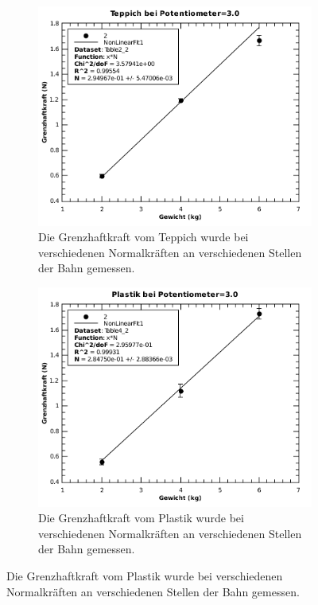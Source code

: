 \begin{figure}[H]
    \centering
    \begin{subfigure}{.7\textwidth}
        \includegraphics[width=\linewidth]{images/teppich_haft_poti=3}
        \caption{Die Grenzhaftkraft vom Teppich wurde bei verschiedenen Normalkr\"aften an verschiedenen Stellen der Bahn gemessen.}
        \label{fig:teppich_haft_poti=3}
    \end{subfigure}
    \begin{subfigure}{.7\textwidth}
        \includegraphics[width=\linewidth]{images/plastik_haft_poti=3}
        \caption{Die Grenzhaftkraft vom Plastik wurde bei verschiedenen Normalkr\"aften an verschiedenen Stellen der Bahn gemessen.}
        \label{fig:plastik_haft_poti=3}
    \end{subfigure}
\end{figure}


